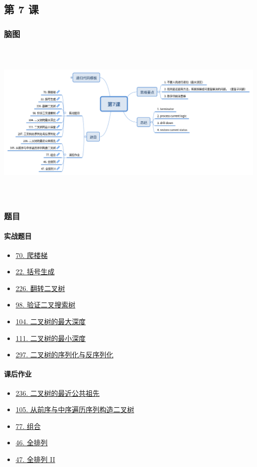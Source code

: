 \subsection{第 7 课}

\subsubsection{脑图}

\includegraphics[width=170mm,height=80mm]{images/第7课.png}

\subsubsection{题目}

\paragraph{实战题目}

\begin{itemize}
  \item \hyperref[leetcode:70]{70. 爬楼梯}
  \item \hyperref[leetcode:22]{22. 括号生成}
  \item \hyperref[leetcode:226]{226. 翻转二叉树}
  \item \hyperref[leetcode:98]{98. 验证二叉搜索树}
  \item \hyperref[leetcode:104]{104. 二叉树的最大深度}
  \item \hyperref[leetcode:111]{111. 二叉树的最小深度}
  \item \hyperref[leetcode:297]{297. 二叉树的序列化与反序列化}
\end{itemize}

\paragraph{课后作业}

\begin{itemize}
  \item \hyperref[leetcode:236]{236. 二叉树的最近公共祖先}
  \item \hyperref[leetcode:105]{105. 从前序与中序遍历序列构造二叉树}
  \item \hyperref[leetcode:77]{77. 组合}
  \item \hyperref[leetcode:46]{46. 全排列}
  \item \hyperref[leetcode:47]{47. 全排列 II}
\end{itemize}
